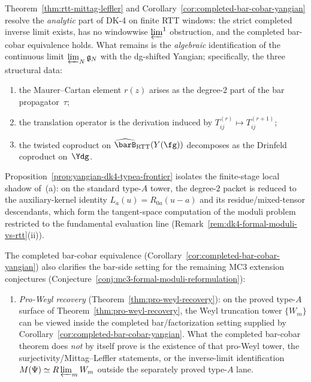 \begin{remark}
\label{rem:dk4-mittag-leffler}
Theorem~\ref{thm:rtt-mittag-leffler} and
Corollary~\ref{cor:completed-bar-cobar-yangian} resolve the
\emph{analytic} part of DK-4 on finite RTT windows: the strict
completed inverse limit exists, has no windowwise
$\varprojlim^1$ obstruction, and the completed bar-cobar
equivalence holds. What remains is the \emph{algebraic}
identification of the continuous limit $\varprojlim_N \mathfrak{g}_N$
with the
dg-shifted Yangian; specifically, the three structural
data:
\begin{enumerate}[label=\textup{(\alph*)}]
\item the Maurer--Cartan element $r(z)$ arises as the
 degree-$2$ part of the bar propagator~$\tau$;
\item the translation operator is the derivation induced by
 $T_{ij}^{(r)} \mapsto T_{ij}^{(r+1)}$;
\item the twisted coproduct on
 $\widehat{\barB}_{\mathrm{RTT}}(Y(\fg))$
 decomposes as the Drinfeld coproduct on~$\Ydg$.
\end{enumerate}
Proposition~\ref{prop:yangian-dk4-typea-frontier} isolates the
finite-stage local shadow of~(a): on the standard type-$A$ tower,
the degree-$2$ packet is reduced to the auxiliary-kernel identity
$L_a(u) = R_{0a}(u - a)$ and its residue/mixed-tensor descendants,
which form the tangent-space computation of the moduli problem
restricted to the fundamental evaluation line
(Remark~\ref{rem:dk4-formal-moduli-vs-rtt}(ii)).

The completed bar-cobar equivalence
\textup{(}Corollary~\ref{cor:completed-bar-cobar-yangian}\textup{)}
also clarifies the bar-side setting for the remaining MC3 extension
conjectures
(Conjecture~\ref{conj:mc3-formal-moduli-reformulation}):
\begin{enumerate}[label=\textup{(\roman*)}]
\item \emph{Pro-Weyl recovery}
 \textup{(}Theorem~\ref{thm:pro-weyl-recovery}\textup{)}:
 on the proved type-$A$ surface of
 Theorem~\ref{thm:pro-weyl-recovery}, the Weyl truncation tower
 $\{W_m\}$ can be viewed inside the completed bar/factorization
 setting supplied by Corollary~\ref{cor:completed-bar-cobar-yangian}.
 What the completed bar-cobar theorem does \emph{not} by itself prove
 is the existence of that pro-Weyl tower, the surjectivity/Mittag--Leffler
 statements, or the inverse-limit identification
 $M(\Psi) \simeq R\varprojlim_m W_m$ outside the separately proved
 type-$A$ lane.


\end{enumerate}
\end{remark}
